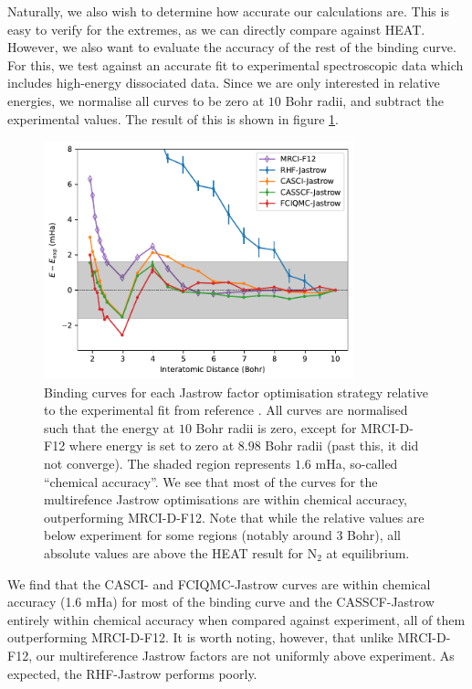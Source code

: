 Naturally, we also wish to determine how accurate our calculations are. This is easy to verify for the extremes, as we can directly compare against \gls{HEAT}.\supercite{fellerSurvey2008} However, we also want to evaluate the accuracy of the rest of the binding curve. For this, we test against an accurate fit to experimental spectroscopic data which includes high-energy dissociated data.\supercite{leroyAccurate2006} Since we are only interested in relative energies, we normalise all curves to be zero at $10$ Bohr radii, and subtract the experimental values. The result of this is shown in figure \ref{fig:binding-curves-experiment}.

\begin{figure}[htbp]
    \centering
    \includegraphics[width=0.8\textwidth]{figures/binding/residuals}
    \caption{Binding curves for each Jastrow factor optimisation strategy relative to the experimental fit from reference . All curves are normalised such that the energy at $10$ Bohr radii is zero, except for MRCI-D-F12 where energy is set to zero at $8.98$ Bohr radii (past this, it did not converge). The shaded region represents $1.6$ mHa, so-called ``chemical accuracy''. We see that most of the curves for the multirefence Jastrow optimisations are within chemical accuracy, outperforming MRCI-D-F12. Note that while the relative values are below experiment for some regions (notably around $3$ Bohr), all absolute values are above the HEAT result for N$_2$ at equilibrium.}
    \label{fig:binding-curves-experiment}
\end{figure}

We find that the CASCI- and FCIQMC-Jastrow curves are within chemical accuracy (1.6 mHa) for most of the binding curve and the CASSCF-Jastrow entirely within chemical accuracy when compared against experiment, all of them outperforming MRCI-D-F12. It is worth noting, however, that unlike MRCI-D-F12, our multireference Jastrow factors are not uniformly above experiment. As expected, the RHF-Jastrow performs poorly.

